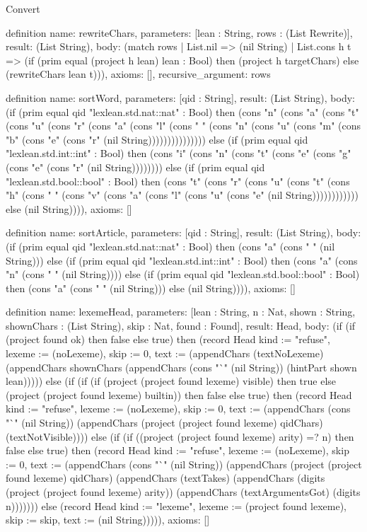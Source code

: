 \begin{lexlean}{Convert}
\begin{semanticmodule}
definition{
  name: rewriteChars,
  parameters: [lean : String, rows : (List Rewrite)],
  result: (List String),
  body: (match rows
    | List.nil => (nil String)
    | List.cons h t => (if (prim equal (project h lean) lean : Bool) then (project h targetChars) else (rewriteChars lean t))),
  axioms: [],
  recursive_argument: rows
}

definition{
  name: sortWord,
  parameters: [qid : String],
  result: (List String),
  body: (if (prim equal qid "lexlean.std.nat::nat" : Bool) then (cons "n" (cons "a" (cons "t" (cons "u" (cons "r" (cons "a" (cons "l" (cons " " (cons "n" (cons "u" (cons "m" (cons "b" (cons "e" (cons "r" (nil String))))))))))))))) else (if (prim equal qid "lexlean.std.int::int" : Bool) then (cons "i" (cons "n" (cons "t" (cons "e" (cons "g" (cons "e" (cons "r" (nil String)))))))) else (if (prim equal qid "lexlean.std.bool::bool" : Bool) then (cons "t" (cons "r" (cons "u" (cons "t" (cons "h" (cons " " (cons "v" (cons "a" (cons "l" (cons "u" (cons "e" (nil String)))))))))))) else (nil String)))),
  axioms: []
}

definition{
  name: sortArticle,
  parameters: [qid : String],
  result: (List String),
  body: (if (prim equal qid "lexlean.std.nat::nat" : Bool) then (cons "a" (cons " " (nil String))) else (if (prim equal qid "lexlean.std.int::int" : Bool) then (cons "a" (cons "n" (cons " " (nil String)))) else (if (prim equal qid "lexlean.std.bool::bool" : Bool) then (cons "a" (cons " " (nil String))) else (nil String)))),
  axioms: []
}

definition{
  name: lexemeHead,
  parameters: [lean : String, n : Nat, shown : String, shownChars : (List String), skip : Nat, found : Found],
  result: Head,
  body: (if (if (project found ok) then false else true) then (record Head {kind := "refuse", lexeme := (noLexeme), skip := 0, text := (appendChars (textNoLexeme) (appendChars shownChars (appendChars (cons "`" (nil String)) (hintPart shown lean))))}) else (if (if (if (project (project found lexeme) visible) then true else (project (project found lexeme) builtin)) then false else true) then (record Head {kind := "refuse", lexeme := (noLexeme), skip := 0, text := (appendChars (cons "`" (nil String)) (appendChars (project (project found lexeme) qidChars) (textNotVisible)))}) else (if (if ((project (project found lexeme) arity) =? n) then false else true) then (record Head {kind := "refuse", lexeme := (noLexeme), skip := 0, text := (appendChars (cons "`" (nil String)) (appendChars (project (project found lexeme) qidChars) (appendChars (textTakes) (appendChars (digits (project (project found lexeme) arity)) (appendChars (textArgumentsGot) (digits n))))))}) else (record Head {kind := "lexeme", lexeme := (project found lexeme), skip := skip, text := (nil String)})))),
  axioms: []
}


\end{semanticmodule}
\end{lexlean}
